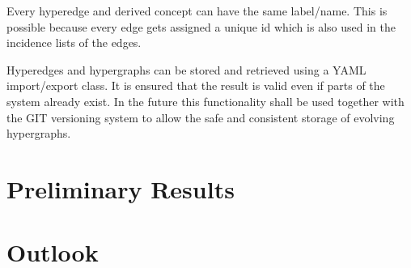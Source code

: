 \documentclass[a4paper,twocolumn]{esapub2005} %
\begin{document}
Every hyperedge and derived concept can have the same label/name.
This is possible because every edge gets assigned a unique id which is also used in the incidence lists of the edges.

Hyperedges and hypergraphs can be stored and retrieved using a YAML import/export class.
It is ensured that the result is valid even if parts of the system already exist.
In the future this functionality shall be used together with the GIT versioning system to allow the safe and consistent storage of evolving hypergraphs.

\section{Preliminary Results}

\section{Outlook}
\end{document}
